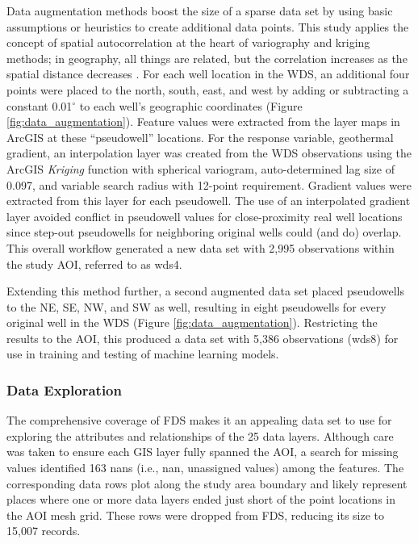 Data augmentation methods boost the size of a sparse data set by using basic assumptions or heuristics to create additional data points. This study applies the concept of spatial autocorrelation at the heart of variography and kriging methods; in geography, all things are related, but the correlation increases as the spatial distance decreases \citep[Chapter\ 13]{gimond_intro_2021}. For each well location in the WDS, an additional four points were placed to the north, south, east, and west by adding or subtracting a constant 0.01$^\circ$ to each well’s geographic coordinates (Figure \ref{fig:data_augmentation}). Feature values were extracted from the layer maps in ArcGIS at these ``pseudowell'' locations. For the response variable, geothermal gradient, an interpolation layer was created from the WDS observations using the ArcGIS \textit{Kriging} function with spherical variogram, auto-determined lag size of 0.097, and variable search radius with 12-point requirement. Gradient values were extracted from this layer for each pseudowell. The use of an interpolated gradient layer avoided conflict in pseudowell values for close-proximity real well locations since step-out pseudowells for neighboring original wells could (and do) overlap. This overall workflow generated a new data set with 2,995 observations within the study AOI, referred to as \acrshort{wds4}. 

Extending this method further, a second augmented data set placed pseudowells to the NE, SE, NW, and SW as well, resulting in eight pseudowells for every original well in the WDS (Figure \ref{fig:data_augmentation}). Restricting the results to the AOI, this produced a data set with 5,386 observations (\acrshort{wds8}) for use in training and testing of machine learning models.

\subsubsection{Data Exploration}
The comprehensive coverage of FDS makes it an appealing data set to use for exploring the attributes and relationships of the 25 data layers. Although care was taken to ensure each GIS layer fully spanned the AOI, a search for missing values identified 163 \acrshort{nan}s (i.e., \acrlong{nan}, unassigned values) among the features. The corresponding data rows plot along the study area boundary and likely represent places where one or more data layers ended just short of the point locations in the AOI mesh grid. These rows were dropped from FDS, reducing its size to 15,007 records.

